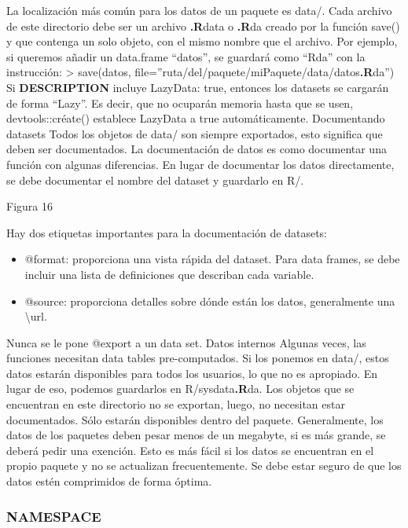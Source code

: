 La localizaci\'on m\'as com\'un para los datos de un paquete es data/. Cada archivo de este
directorio debe ser un archivo \textbf{.R}data o \textbf{.R}da creado por la funci\'on save() y que contenga un
solo objeto, con el mismo nombre que el archivo.
Por ejemplo, si queremos a\~nadir un data.frame “datos”, se guardar\'a como “Rda” con la
instrucci\'on:
> save(datos, file=”ruta/del/paquete/miPaquete/data/datos\textbf{.R}da”)
Si \textbf{DESCRIPTION} incluye LazyData: true, entonces los datasets se cargar\'an de forma
“Lazy”. Es decir, que no ocupar\'an memoria hasta que se usen, devtools::cr\'eate() establece
LazyData a true autom\'aticamente.
Documentando datasets
Todos los objetos de data/ son siempre exportados, esto significa que deben ser
documentados.
La documentaci\'on de datos es como documentar una funci\'on con algunas diferencias. En
lugar de documentar los datos directamente, se debe documentar el nombre del dataset y
guardarlo en R/.

Figura 16

Hay dos etiquetas importantes para la documentaci\'on de datasets:

\begin{itemize}
    \item @format: proporciona una vista r\'apida del dataset. Para data frames, se debe incluir
una lista de definiciones que describan cada variable.
    \item @source: proporciona detalles sobre d\'onde est\'an los datos, generalmente una \textbackslash url{}.
\end{itemize}

Nunca se le pone @export a un data set.
Datos internos
Algunas veces, las funciones necesitan data tables pre-computados. Si los ponemos en data/,
estos datos estar\'an disponibles para todos los usuarios, lo que no es apropiado. En lugar de
eso, podemos guardarlos en R/sysdata\textbf{.R}da. Los objetos que se encuentran en este directorio
no se exportan, luego, no necesitan estar documentados. S\'olo estar\'an disponibles dentro del
paquete.
Generalmente, los datos de los paquetes deben pesar menos de un megabyte, si es m\'as
grande, se deber\'a pedir una exenci\'on. Esto es m\'as f\'acil si los datos se encuentran en el
propio paquete y no se actualizan frecuentemente.
Se debe estar seguro de que los datos est\'en comprimidos de forma \'optima.

\subsubsection{NAMESPACE}

